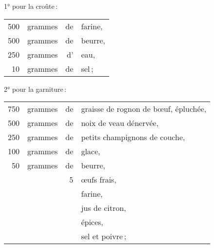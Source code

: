 1° pour la croûte :

\medskip

\footnotesize
\begin{longtable}{rrrp{16em}}
    500 & grammes & de & farine,                                                                          \\
    500 & grammes & de & beurre,                                                                          \\
    250 & grammes & d' & eau,                                                                             \\
     10 & grammes & de & sel ;                                                                            \\
\end{longtable}
\normalsize

2° pour la garniture :

\medskip

\footnotesize
\begin{longtable}{rrrp{16em}}
    750 & grammes & de & graisse de rognon de bœuf, épluchée,                                             \\
    500 & grammes & de & noix de veau dénervée,                                                           \\
    250 & grammes & de & petits champignons de couche,                                                    \\
    100 & grammes & de & glace,                                                                           \\
     50 & grammes & de & beurre,                                                                          \\
        &         &  5 & œufs frais,                                                                      \\
        &         &    & farine,                                                                          \\
        &         &    & jus de citron,                                                                   \\
        &         &    & épices,                                                                          \\
        &         &    & sel et poivre ;                                                                  \\
\end{longtable}
\normalsize

